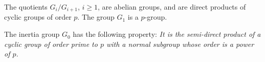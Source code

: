 \begin{prop}
    The quotients $G_i/G_{i+1}$, $i \geq 1$, are abelian groups, and are direct products of cyclic groups of order $p$.
    The group $G_1$ is a $p$-group.
\end{prop}

\begin{prop}
    The inertia group $G_0$ has the following property:
    \textit{It is the semi-direct product of a cyclic group of order prime to $p$ with a normal subgroup whose order is a power of $p$.}
\end{prop}
